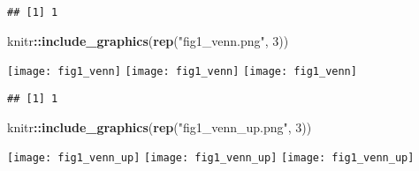 \documentclass[]{article}
\newenvironment{Shaded}{\begin{snugshade}}{\end{snugshade}}
\newcommand{\DataTypeTok}[1]{\textcolor[rgb]{0.13,0.29,0.53}{#1}}
\newcommand{\DecValTok}[1]{\textcolor[rgb]{0.00,0.00,0.81}{#1}}
\newcommand{\KeywordTok}[1]{\textcolor[rgb]{0.13,0.29,0.53}{\textbf{#1}}}
\newcommand{\NormalTok}[1]{#1}
\newcommand{\OperatorTok}[1]{\textcolor[rgb]{0.81,0.36,0.00}{\textbf{#1}}}
\newcommand{\StringTok}[1]{\textcolor[rgb]{0.31,0.60,0.02}{#1}}
\begin{document}
\begin{verbatim}
## [1] 1
\end{verbatim}

\begin{Shaded}
\begin{Highlighting}[]
\NormalTok{knitr}\OperatorTok{::}\KeywordTok{include_graphics}\NormalTok{(}\KeywordTok{rep}\NormalTok{(}\StringTok{"fig1_venn.png"}\NormalTok{, }\DecValTok{3}\NormalTok{))}
\end{Highlighting}
\end{Shaded}

\texttt{[image: fig1\_venn]}
\texttt{[image: fig1\_venn]}
\texttt{[image: fig1\_venn]}

\begin{Shaded}
\end{Shaded}

\begin{verbatim}
## [1] 1
\end{verbatim}

\begin{Shaded}
\begin{Highlighting}[]
\NormalTok{knitr}\OperatorTok{::}\KeywordTok{include_graphics}\NormalTok{(}\KeywordTok{rep}\NormalTok{(}\StringTok{"fig1_venn_up.png"}\NormalTok{, }\DecValTok{3}\NormalTok{))}
\end{Highlighting}
\end{Shaded}

\texttt{[image: fig1\_venn\_up]}
\texttt{[image: fig1\_venn\_up]}
\texttt{[image: fig1\_venn\_up]}
\end{document}
